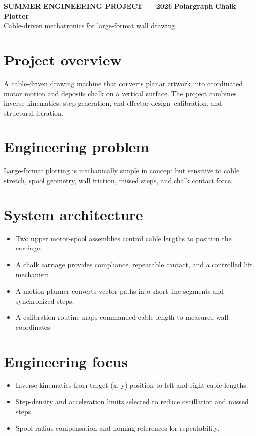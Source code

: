 \documentclass[10pt]{article}
\begin{document}
{\color{blue}\small\bfseries SUMMER ENGINEERING PROJECT --- 2026}
\vspace{0.4em}
{\color{navy}\LARGE\bfseries Polargraph Chalk Plotter}\\
{\color{muted}\large Cable-driven mechatronics for large-format wall drawing}

\section*{Project overview}
A cable-driven drawing machine that converts planar artwork into coordinated motor motion and deposits chalk on a vertical surface. The project combines inverse kinematics, step generation, end-effector design, calibration, and structural iteration.

\section*{Engineering problem}
Large-format plotting is mechanically simple in concept but sensitive to cable stretch, spool geometry, wall friction, missed steps, and chalk contact force.

\section*{System architecture}
\begin{itemize}
\item Two upper motor-spool assemblies control cable lengths to position the carriage.
\item A chalk carriage provides compliance, repeatable contact, and a controlled lift mechanism.
\item A motion planner converts vector paths into short line segments and synchronized steps.
\item A calibration routine maps commanded cable length to measured wall coordinates.
\end{itemize}

\section*{Engineering focus}
\begin{itemize}
\item Inverse kinematics from target (x, y) position to left and right cable lengths.
\item Step-density and acceleration limits selected to reduce oscillation and missed steps.
\item Spool-radius compensation and homing references for repeatability.
\end{itemize}
\end{document}
